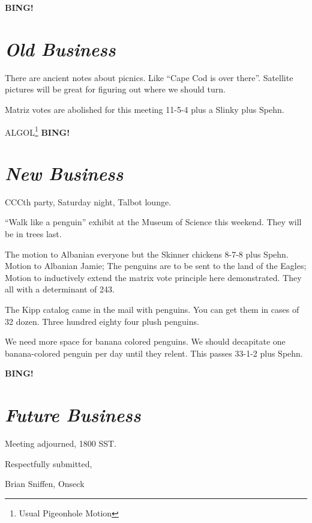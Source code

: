 \documentclass[10pt]{article}
\newcommand{\bing}{{\bf BING!} }
\newcommand{\goto}[1]{\bing \vskip 12pt \section*{{\em{#1}}}}
\newcommand{\ps}{ plus Spehn\xspace}
\begin{document}
\goto{Old Business}
There are ancient notes about picnics.  Like ``Cape Cod is over there''.
Satellite pictures will be great for figuring out where we should turn.

Matriz votes are abolished for this meeting 11-5-4 plus a Slinky\ps.

ALGOL\footnote{Usual Pigeonhole Motion}
\goto{New Business}
CCCth party, Saturday night, Talbot lounge.

``Walk like a penguin'' exhibit at the Museum of Science this
weekend.  They will be in trees last.

The motion to Albanian everyone but the Skinner chickens 8-7-8\ps.
Motion to Albanian Jamie;
The penguins are to be sent to the land of the Eagles;
Motion to inductively extend the matrix vote principle here
demonstrated.  They all with a determinant of 243.

The Kipp catalog came in the mail with penguins.  You can get them in
cases of 32 dozen.  Three hundred eighty four plush penguins.

We need more space for banana colored penguins.  We should decapitate
one banana-colored penguin per day until they relent. This passes 33-1-2\ps.

\goto{Future Business}

\vspace{12pt}

\noindent
Meeting adjourned, 1800 SST.

\vspace{18pt}

\centerline{Respectfully submitted,}
\centerline{Brian Sniffen, Onseck}
\end{document}
